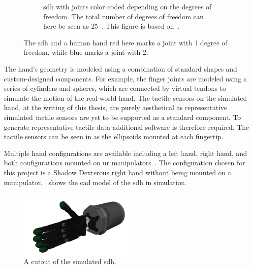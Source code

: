 \begin{figure}[h]
\begin{subfigure}[b]{0.48\textwidth}
		\caption{\gls{sdh} with joints color coded depending on the degrees of freedom. The total number of degrees of freedom can here be seen as \num{25}~\cite{design-and-development-of-a-bilateral-therapeutic-hand-device-for-stroke-rehabilitation}. This figure is based on~\cite{svg-skeleton-hand}.}
		\label{fig:human-hand-skeleton}
	\end{subfigure}
	\caption{The \gls{sdh} and a human hand red here marks a joint with \num{1} degree of freedom, while blue marks a joint with \num{2}.}
	\label{fig:hands-dof}
\end{figure}

The hand's geometry is modeled using a combination of standard shapes and custom-designed components. For example, the finger joints are modeled using a series of cylinders and spheres, which are connected by virtual tendons to simulate the motion of the real-world hand. The tactile sensors on the simulated hand, at the writing of this thesis, are purely aesthetical as representative simulated tactile sensors are yet to be supported as a standard component. To generate representative tactile data additional software is therefore required. The tactile sensors can be seen in  as the ellipsoids mounted at each fingertip. \medskip

Multiple hand configurations are available including a left hand, right hand, and both configurations mounted on \gls{ur} manipulators~\cite{shadow-hand-configurations}. The configuration chosen for this project is a Shadow Dexterous right hand without being mounted on a manipulator.~ shows the \gls{cad} model of the \gls{sdh} in simulation.

\begin{figure}[h]
	\begin{small}
		\begin{center}
			\includegraphics[width=0.5\textwidth]{chapters/system-setup/fig/simulation-robot-hand.png}
		\end{center}
		\caption{A cutout of the simulated \gls{sdh}.}
		\label{fig:simulated-robot-hand}
	\end{small}
\end{figure}

